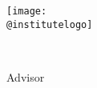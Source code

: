 \makeatletter
\begin{titlepage}
    \begin{center}
        \texttt{[image: \\@institutelogo]}

	\vspace*{3cm}

	{\Huge \textbf{\thetitle} \par}

	{\Large \@subtitle \par}

	\vspace*{1.0cm}

	{\LARGE \@course \par}

	\vspace*{3.5cm}

	{\LARGE \theauthor \par}

	\vspace*{1.0cm}

	{\LARGE \@supervisor\\
	{\large Advisor \par} \par}

        \vfill

	{\Large \@institute}

	{\Large \thedate \par}

    \end{center}
\end{titlepage}
\makeatother

